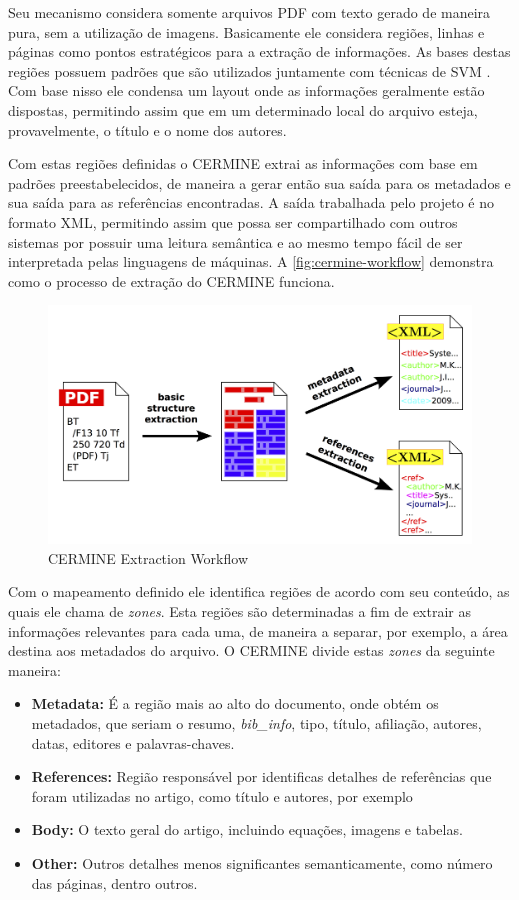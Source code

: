 Seu mecanismo considera somente arquivos PDF com texto gerado de maneira pura, sem a utilização de imagens. Basicamente ele considera regiões, linhas e páginas como pontos estratégicos para a extração de informações. As bases destas regiões possuem padrões que são utilizados juntamente com técnicas de SVM \cite{Han-SVM}. Com base nisso ele condensa um layout onde as informações geralmente estão dispostas, permitindo assim que em um determinado local do arquivo esteja, provavelmente, o título e o nome dos autores. 

Com estas regiões definidas o CERMINE extrai as informações com base em padrões preestabelecidos, de maneira a gerar então sua saída para os metadados e sua saída para as referências encontradas. A saída trabalhada pelo projeto é no formato XML, permitindo assim que possa ser compartilhado com outros sistemas por possuir uma leitura semântica e ao mesmo tempo fácil de ser interpretada pelas linguagens de máquinas. A \autoref{fig:cermine-workflow} demonstra como o processo de extração do CERMINE funciona.

\begin{figure}
    \centering
    \caption{CERMINE Extraction Workflow}
    \label{fig:cermine-workflow}
    \includegraphics[width=0.7\linewidth]{./assets/images/cermine}
\end{figure}

Com o mapeamento definido ele identifica regiões de acordo com seu conteúdo, as quais ele chama de \textit{zones}. Esta regiões são determinadas a fim de extrair as informações relevantes para cada uma, de maneira a separar, por exemplo, a área destina aos metadados do arquivo. O CERMINE divide estas \textit{zones} da seguinte maneira:

\begin{itemize}
    \item \textbf{Metadata:} É a região mais ao alto do documento, onde obtém os metadados, que seriam o resumo, \textit{bib\_info}, tipo, título, afiliação, autores, datas, editores e palavras-chaves.
    \item \textbf{References:} Região responsável por identificas detalhes de referências que foram utilizadas no artigo, como título e autores, por exemplo
    \item \textbf{Body:} O texto geral do artigo, incluindo equações, imagens e tabelas.
    \item \textbf{Other:} Outros detalhes menos significantes semanticamente, como número das páginas, dentro outros.
\end{itemize}

